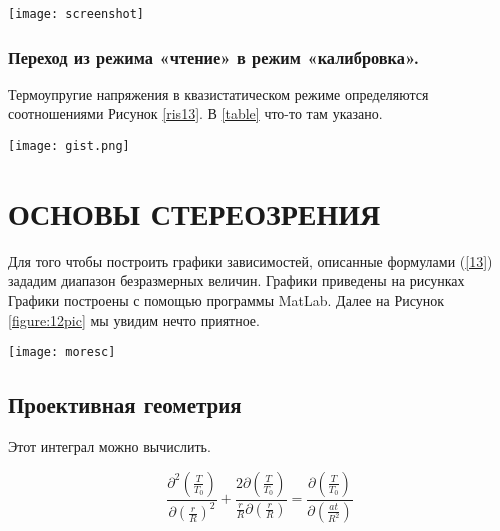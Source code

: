 \documentclass[a4paper, 14pt]{extreport} %
\begin{document}
\begin{center}
	\begin{minipage}{0.93\linewidth}
		\texttt{[image: screenshot]}
		\label{ris12}
	\end{minipage}
\end{center}
\vspace{0.7cm}

\subsection{Переход из режима «чтение» в режим «калибровка».} 
Термоупругие напряжения в квазистатическом режиме определяются соотношениями Рисунок \ref{ris13}. В \ref{table} что-то там указано.
\begin{center}
	\begin{minipage}{0.9\linewidth}
		\texttt{[image: gist.png]}
		\label{ris13}
	\end{minipage}
\end{center}

\chapter{ОСНОВЫ СТЕРЕОЗРЕНИЯ}
Для того чтобы построить графики зависимостей, описанные формулами (\ref{13}) зададим диапазон безразмерных \cite{b1} величин. Графики приведены на рисунках Графики построены с помощью программы MatLab. Далее на Рисунок \ref{figure:12pic} мы увидим нечто приятное.

\begin{center}
	\begin{minipage}{1\linewidth}
		\texttt{[image: moresc]}
		\label{figure:12pic}
	\end{minipage}
\end{center}
\vspace{0.6cm}

\section{Проективная геометрия}
Этот интеграл можно вычислить.

\vspace{0.7cm} 
\begin{equation}
\label{21}
\frac{\partial^2{\left(\frac{T}{T_0}\right)}}{\partial{\left(\frac{r}{R}\right)^2}}+\frac{2\partial{\left(\frac{T}{T_0}\right)}}{\frac{r}{R}\partial{\left(\frac{r}{R}\right)}}=\frac{\partial{\left(\frac{T}{T_0}\right)}}{\partial{\left(\frac{at}{R^2}\right)}}
\end{equation}
\vspace{0.7cm} 
\end{document}
